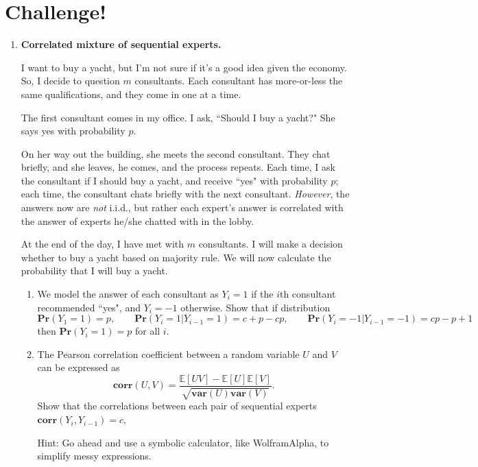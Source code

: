 \documentclass{article}
\newcommand{\bE}{\mathbb E}
\newcommand{\var}{\mathbf{var}}
\newcommand{\pr}{\mathbf{Pr}}
\begin{document}
\newpage
\section*{Challenge!}


\begin{enumerate}

\item\textbf{Correlated mixture of sequential experts.} 

I want to buy a yacht, but I'm not sure if it's a good idea given the economy. So, I decide to question $m$ consultants. Each consultant has more-or-less the same qualifications, and they come in one at a time.


The first consultant comes in my office. I ask, ``Should I buy a yacht?" She says yes with probability $p$.

On her way out the building, she meets the second consultant. They chat briefly, and she leaves, he comes, and the process repeats. Each time, I ask the consultant if I should buy a yacht, and receive ``yes" with probability $p$; each time, the consultant chats briefly with the next consultant. \emph{However}, the answers now are \emph{not} i.i.d., but rather each expert's answer is correlated with the answer of experts he/she chatted with in the lobby.

At the end of the day, I have met with $m$ consultants. I will make a decision whether to buy a yacht based on majority rule. We will now calculate the probability that I will buy a yacht.


\begin{enumerate}
\item We model the answer of each consultant as $Y_i = 1$ if the $i$th consultant recommended ``yes", and $Y_i = -1$ otherwise. 
Show that if distribution 
\[
\pr(Y_1 = 1) = p, \qquad \pr(Y_i = 1 | Y_{i-1} = 1) = c + p - cp, \qquad \pr(Y_i=-1|Y_{i-1}=-1) = cp-p+1
\]
then $\pr(Y_i = 1) = p$ for all $i$. 




\item The Pearson correlation coefficient between a random variable $U$ and $V$ can be expressed as 
\[
\mathbf{corr}(U,V) = \frac{\bE[UV]-\bE[U]\bE[V]}{\sqrt{\var(U)\var(V)}}.
\]
Show that the correlations between each pair of sequential experts $\mathbf{corr}(Y_i, Y_{i-1}) = c$,

Hint: Go ahead and use a symbolic calculator, like WolframAlpha, to simplify messy expressions.




\end{enumerate}
\end{enumerate}
\end{document}
